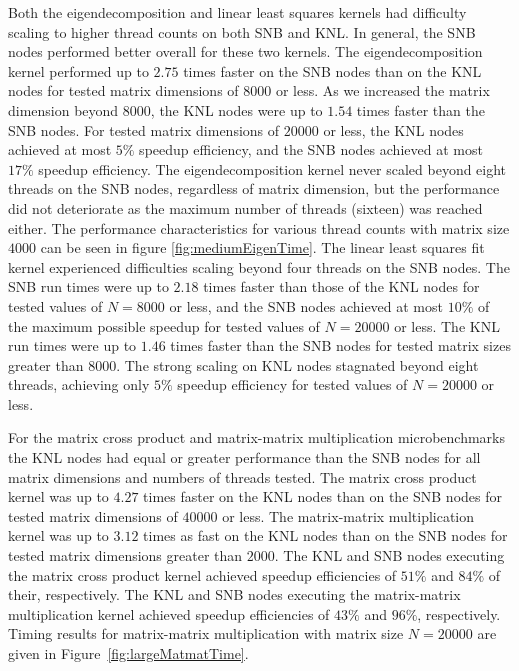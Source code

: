 Both the eigendecomposition and linear least squares kernels had difficulty scaling
to higher thread counts on both SNB and KNL. In general, the SNB nodes performed better
overall for these two kernels. The eigendecomposition kernel performed up to $2.75$ times
faster on the SNB nodes than on the KNL nodes for tested matrix dimensions of $8000$ or
less. As we increased the matrix dimension beyond $8000$, the KNL nodes were up to $1.54$
times faster than the SNB nodes. For tested matrix dimensions of $20000$ or less, the KNL
nodes achieved at most $5\%$ speedup efficiency, and the SNB nodes achieved
at most $17\%$ speedup efficiency. The eigendecomposition kernel never scaled
beyond eight threads on the SNB nodes, regardless of matrix dimension, but the performance
did not deteriorate as the maximum number of threads (sixteen) was reached either. The
performance characteristics for various thread counts with matrix size $4000$ can be seen
in figure \ref{fig:mediumEigenTime}. The linear least squares fit kernel experienced
difficulties scaling beyond four threads on the SNB nodes. The SNB run times were up to
$2.18$ times faster than those of the KNL nodes for tested values of $N=8000$ or less, and
the SNB nodes achieved at most $10\%$ of the maximum possible speedup for tested values of
$N=20000$ or less. The KNL run times were up to $1.46$ times faster than the SNB nodes for
tested matrix sizes greater than $8000$. The strong scaling on KNL nodes stagnated beyond
eight threads, achieving only $5\%$ speedup efficiency for tested values of
$N=20000$ or less.

For the matrix cross product and matrix-matrix multiplication microbenchmarks the KNL
nodes had equal or greater performance than the SNB nodes for all matrix dimensions and
numbers of threads tested. The matrix cross product kernel was up to $4.27$ times faster
on the KNL nodes than on the SNB nodes for tested matrix dimensions of $40000$ or less.
The matrix-matrix multiplication kernel was up to $3.12$ times as fast on the KNL nodes
than on the SNB nodes for tested matrix dimensions greater than $2000$. The KNL and SNB
nodes executing the matrix cross product kernel achieved speedup efficiencies of
$51\%$ and $84\%$ of their, respectively. The KNL and SNB nodes executing the matrix-matrix
multiplication kernel achieved speedup efficiencies of $43\%$ and $96\%$, respectively.
Timing results for matrix-matrix multiplication with matrix size $N=20000$
are given in Figure~\ref{fig:largeMatmatTime}.

